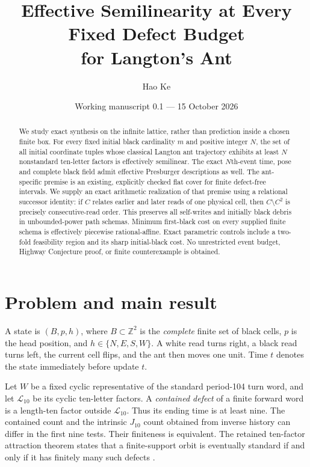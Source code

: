 \documentclass[11pt]{article}
\title{Effective Semilinearity at Every Fixed Defect Budget\\for Langton's Ant}
\author{Hao Ke}
\date{Working manuscript 0.1 --- 15 October 2026}
\theoremstyle{remark}\newtheorem{remark}[theorem]{Remark}
\newcommand{\Z}{\mathbb Z}\newcommand{\N}{\mathbb N}
\begin{document}
\maketitle
\begin{abstract}
We study exact synthesis on the infinite lattice, rather than prediction inside
a chosen finite box. For every fixed initial black cardinality $m$ and positive
integer $N$, the set of all initial coordinate tuples whose classical Langton
ant trajectory exhibits at least $N$ nonstandard ten-letter factors is
effectively semilinear. The exact $N$th-event time, pose and complete black
field admit effective Presburger descriptions as well. The ant-specific premise
is an existing, explicitly checked flat cover for finite defect-free intervals.
We supply an exact arithmetic realization of that premise using a relational
successor identity: if $C$ relates earlier and later reads of one physical cell,
then $C\setminus C^2$ is precisely consecutive-read order. This preserves all
self-writes and initially black debris in unbounded-power path schemas.
Minimum first-black cost on every supplied finite schema is effectively
piecewise rational-affine. Exact parametric controls include a two-fold
feasibility region and its sharp initial-black cost. No unrestricted event
budget, Highway Conjecture proof, or finite counterexample is obtained.
\end{abstract}

\section{Problem and main result}
A state is $(B,p,h)$, where $B\subset\Z^2$ is the \emph{complete} finite set of
black cells, $p$ is the head position, and $h\in\{N,E,S,W\}$. A white read turns
right, a black read turns left, the current cell flips, and the ant then moves
one unit. Time $t$ denotes the state immediately before update $t$.

Let $W$ be a fixed cyclic representative of the standard period-104 turn word,
and let $\mathcal L_{10}$ be its cyclic ten-letter factors. A \emph{contained
defect} of a finite forward word is a length-ten factor outside
$\mathcal L_{10}$. Thus its ending time is at least nine. The contained count
and the intrinsic $J_{10}$ count obtained from inverse history can differ in the
first nine tests. Their finiteness is equivalent. The retained ten-factor
attraction theorem states that a finite-support orbit is eventually standard
if and only if it has finitely many such defects \cite{project}.
\end{document}
